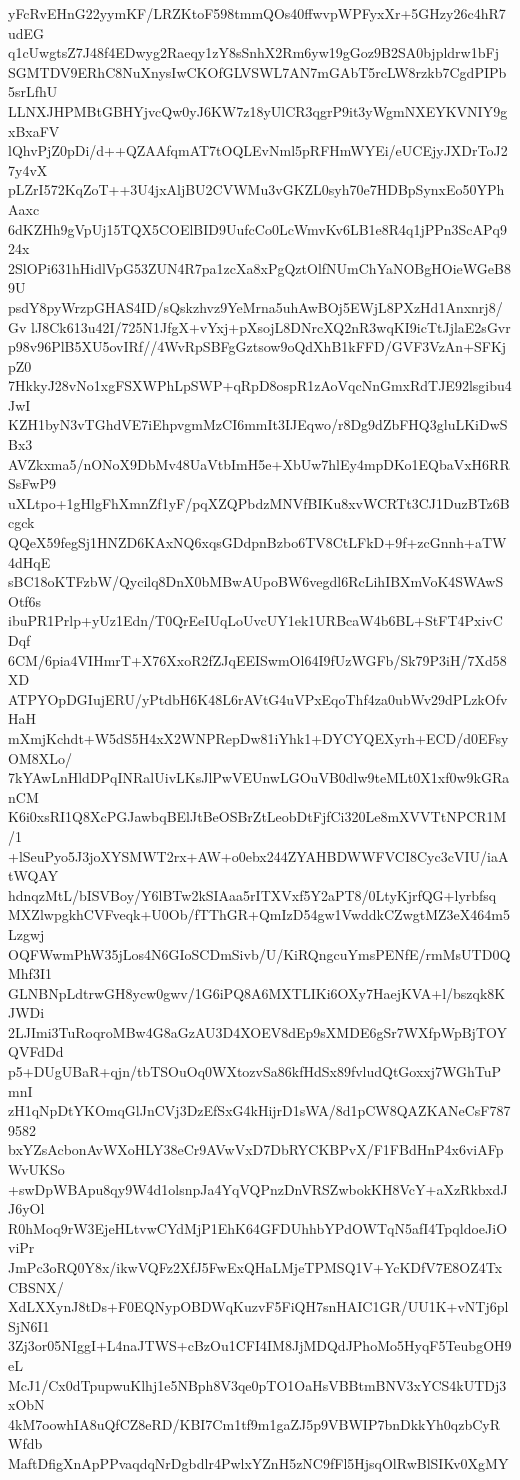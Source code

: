 yFcRvEHnG22yymKF/LRZKtoF598tmmQOs40ffwvpWPFyxXr+5GHzy26c4hR7udEG
q1cUwgtsZ7J48f4EDwyg2Raeqy1zY8sSnhX2Rm6yw19gGoz9B2SA0bjpldrw1bFj
SGMTDV9ERhC8NuXnysIwCKOfGLVSWL7AN7mGAbT5rcLW8rzkb7CgdPIPb5srLfhU
LLNXJHPMBtGBHYjvcQw0yJ6KW7z18yUlCR3qgrP9it3yWgmNXEYKVNIY9gxBxaFV
lQhvPjZ0pDi/d++QZAAfqmAT7tOQLEvNml5pRFHmWYEi/eUCEjyJXDrToJ27y4vX
pLZrI572KqZoT++3U4jxAljBU2CVWMu3vGKZL0syh70e7HDBpSynxEo50YPhAaxc
6dKZHh9gVpUj15TQX5COElBID9UufcCo0LcWmvKv6LB1e8R4q1jPPn3ScAPq924x
2SlOPi631hHidlVpG53ZUN4R7pa1zcXa8xPgQztOlfNUmChYaNOBgHOieWGeB89U
psdY8pyWrzpGHAS4ID/sQskzhvz9YeMrna5uhAwBOj5EWjL8PXzHd1Anxnrj8/Gv
lJ8Ck613u42I/725N1JfgX+vYxj+pXsojL8DNrcXQ2nR3wqKI9icTtJjlaE2sGvr
p98v96PlB5XU5ovIRf//4WvRpSBFgGztsow9oQdXhB1kFFD/GVF3VzAn+SFKjpZ0
7HkkyJ28vNo1xgFSXWPhLpSWP+qRpD8ospR1zAoVqcNnGmxRdTJE92lsgibu4JwI
KZH1byN3vTGhdVE7iEhpvgmMzCI6mmIt3IJEqwo/r8Dg9dZbFHQ3gluLKiDwSBx3
AVZkxma5/nONoX9DbMv48UaVtbImH5e+XbUw7hlEy4mpDKo1EQbaVxH6RRSsFwP9
uXLtpo+1gHlgFhXmnZf1yF/pqXZQPbdzMNVfBIKu8xvWCRTt3CJ1DuzBTz6Bcgck
QQeX59fegSj1HNZD6KAxNQ6xqsGDdpnBzbo6TV8CtLFkD+9f+zcGnnh+aTW4dHqE
sBC18oKTFzbW/Qycilq8DnX0bMBwAUpoBW6vegdl6RcLihIBXmVoK4SWAwSOtf6s
ibuPR1Prlp+yUz1Edn/T0QrEeIUqLoUvcUY1ek1URBcaW4b6BL+StFT4PxivCDqf
6CM/6pia4VIHmrT+X76XxoR2fZJqEEISwmOl64I9fUzWGFb/Sk79P3iH/7Xd58XD
ATPYOpDGIujERU/yPtdbH6K48L6rAVtG4uVPxEqoThf4za0ubWv29dPLzkOfvHaH
mXmjKchdt+W5dS5H4xX2WNPRepDw81iYhk1+DYCYQEXyrh+ECD/d0EFsyOM8XLo/
7kYAwLnHldDPqINRalUivLKsJlPwVEUnwLGOuVB0dlw9teMLt0X1xf0w9kGRanCM
K6i0xsRI1Q8XcPGJawbqBElJtBeOSBrZtLeobDtFjfCi320Le8mXVVTtNPCR1M/1
+lSeuPyo5J3joXYSMWT2rx+AW+o0ebx244ZYAHBDWWFVCI8Cyc3cVIU/iaAtWQAY
hdnqzMtL/bISVBoy/Y6lBTw2kSIAaa5rITXVxf5Y2aPT8/0LtyKjrfQG+lyrbfsq
MXZlwpgkhCVFveqk+U0Ob/fTThGR+QmIzD54gw1VwddkCZwgtMZ3eX464m5Lzgwj
OQFWwmPhW35jLos4N6GIoSCDmSivb/U/KiRQngcuYmsPENfE/rmMsUTD0QMhf3I1
GLNBNpLdtrwGH8ycw0gwv/1G6iPQ8A6MXTLIKi6OXy7HaejKVA+l/bszqk8KJWDi
2LJImi3TuRoqroMBw4G8aGzAU3D4XOEV8dEp9sXMDE6gSr7WXfpWpBjTOYQVFdDd
p5+DUgUBaR+qjn/tbTSOuOq0WXtozvSa86kfHdSx89fvludQtGoxxj7WGhTuPmnI
zH1qNpDtYKOmqGlJnCVj3DzEfSxG4kHijrD1sWA/8d1pCW8QAZKANeCsF7879582
bxYZsAcbonAvWXoHLY38eCr9AVwVxD7DbRYCKBPvX/F1FBdHnP4x6viAFpWvUKSo
+swDpWBApu8qy9W4d1olsnpJa4YqVQPnzDnVRSZwbokKH8VcY+aXzRkbxdJJ6yOl
R0hMoq9rW3EjeHLtvwCYdMjP1EhK64GFDUhhbYPdOWTqN5afI4TpqldoeJiOviPr
JmPc3oRQ0Y8x/ikwVQFz2XfJ5FwExQHaLMjeTPMSQ1V+YcKDfV7E8OZ4TxCBSNX/
XdLXXynJ8tDs+F0EQNypOBDWqKuzvF5FiQH7snHAIC1GR/UU1K+vNTj6plSjN6I1
3Zj3or05NIggI+L4naJTWS+cBzOu1CFI4IM8JjMDQdJPhoMo5HyqF5TeubgOH9eL
McJ1/Cx0dTpupwuKlhj1e5NBph8V3qe0pTO1OaHsVBBtmBNV3xYCS4kUTDj3xObN
4kM7oowhIA8uQfCZ8eRD/KBI7Cm1tf9m1gaZJ5p9VBWIP7bnDkkYh0qzbCyRWfdb
MaftDfigXnApPPvaqdqNrDgbdlr4PwlxYZnH5zNC9fFl5HjsqOlRwBlSIKv0XgMY
